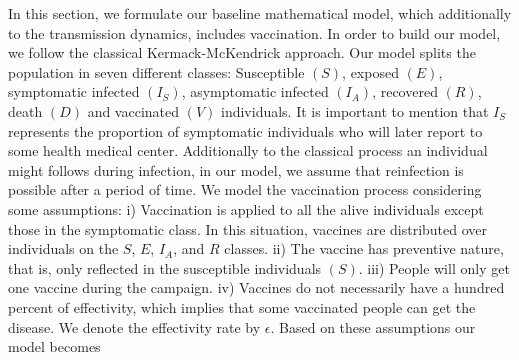 \noindent In this section, we formulate our baseline mathematical model, which additionally to the transmission dynamics, includes vaccination. In order to build our model, we follow the classical Kermack-McKendrick approach. Our model splits the population in seven different classes: Susceptible $(S)$, exposed $(E)$, symptomatic infected $(I_S)$, asymptomatic infected $(I_A)$, recovered $(R)$, death $(D)$ and vaccinated $(V)$ individuals. It is important to mention that $I_{S}$ represents the proportion of symptomatic individuals who will later report to some health medical center. Additionally to the classical process an individual might follows during infection, in our model, we assume that reinfection is possible after a period of time. We model the vaccination process considering some assumptions: i) Vaccination is applied to all the alive individuals except those in the symptomatic class. In this situation, vaccines are distributed over individuals on the $S$, $E$, $I_A$, and $R$ classes. ii) The vaccine has preventive nature, that is, only reflected in the susceptible individuals $(S)$. iii) People will only get one vaccine during the campaign. iv) Vaccines do not necessarily have a hundred percent of effectivity, which implies that some vaccinated people can get the disease. We denote the effectivity rate by $\epsilon$. Based on these assumptions our model becomes

